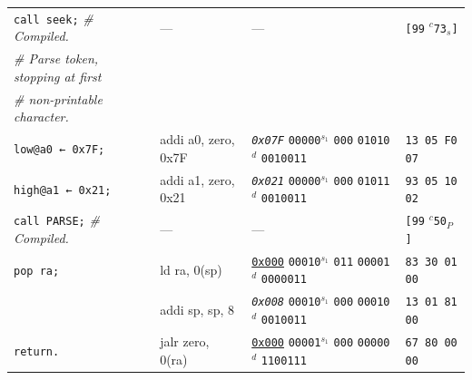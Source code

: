 \documentclass[a4paper,12pt,final]{article}
\begin{document}
\begin{table}[!htbp]
\begin{adjustwidth}{-1cm}{-1cm}
\begin{center}
\begin{tabular}{l|ll|l}
\texttt{call seek;}  \emph{\# Compiled.} & --- & --- & \texttt{[99} \(^{c}\)​\texttt{73}​\(_{s}\)​\texttt{]}\\[0pt]
\emph{\# Parse token, stopping at first} &  &  & \\[0pt]
\emph{\# non-printable character.} &  &  & \\[0pt]
\texttt{low@a0 ← 0x7F;} & addi a0, zero, 0x7F & \emph{\texttt{0x07F}}                    \texttt{00000}​\(^{s_{1}}\) \texttt{000} \texttt{01010}​\(^{d}\)  \texttt{0010011} & \texttt{13 05 F0 07}\\[0pt]
\texttt{high@a1 ← 0x21;} & addi a1, zero, 0x21 & \emph{\texttt{0x021}}                    \texttt{00000}​\(^{s_{1}}\) \texttt{000} \texttt{01011}​\(^{d}\)  \texttt{0010011} & \texttt{93 05 10 02}\\[0pt]
\texttt{call PARSE;}  \emph{\# Compiled.} & --- & --- & \texttt{[99} \(^{c}\)​\texttt{50}​\(_{P}\)​\texttt{]}\\[0pt]
\texttt{pop ra;} & ld ra, 0(sp) & \uline{\texttt{0x000}}                    \texttt{00010}​\(^{s_{1}}\) \texttt{011} \texttt{00001}​\(^{d}\)  \texttt{0000011} & \texttt{83 30 01 00}\\[0pt]
 & addi sp, sp, 8 & \emph{\texttt{0x008}}                    \texttt{00010}​\(^{s_{1}}\) \texttt{000} \texttt{00010}​\(^{d}\)  \texttt{0010011} & \texttt{13 01 81 00}\\[0pt]
\texttt{return.} & jalr zero, 0(ra) & \uline{\texttt{0x000}}                    \texttt{00001}​\(^{s_{1}}\) \texttt{000} \texttt{00000}​\(^{d}\)  \texttt{1100111} & \texttt{67 80 00 00}\\[0pt]
\end{tabular}

\end{center}
\normalsize \end{adjustwidth} \end{table} \vspace{0}
\end{document}
